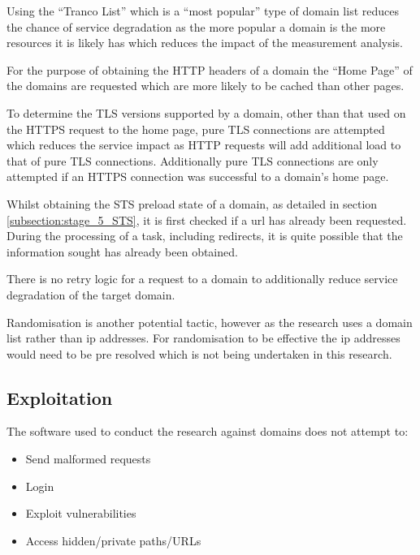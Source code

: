 \documentclass{mscreport}
\begin{document}
Using the ``Tranco List'' which is a ``most popular'' type of domain list reduces the chance of service degradation as the more popular a domain is the more resources it is likely has which reduces the impact of the measurement analysis.

\vspace{0.3cm} \noindent
For the purpose of obtaining the HTTP headers of a domain the ``Home Page'' of the domains are requested which are more likely to be cached than other pages.

\vspace{0.3cm} \noindent
To determine the TLS versions supported by a domain, other than that used on the HTTPS request to the home page, pure TLS connections are attempted which reduces the service impact as HTTP requests will add additional load to that of pure TLS connections. Additionally pure TLS connections are only attempted if an HTTPS connection was successful to a domain's home page.

\vspace{0.3cm} \noindent
Whilst obtaining the STS preload state of a domain, as detailed in section \ref{subsection:stage_5_STS}, it is first checked if a url has already been requested. During the processing of a task, including redirects, it is quite possible that the information sought has already been obtained.

\vspace{0.3cm} \noindent
There is no retry logic for a request to a domain to additionally reduce service degradation of the target domain.

\vspace{0.3cm} \noindent
Randomisation is another potential tactic, however as the research uses a domain list rather than ip addresses. For randomisation to be effective the ip addresses would need to be pre resolved which is not being undertaken in this research.

\subsection{Exploitation}

The software used to conduct the research against domains does not attempt to:

\begin{itemize}
	\setlength\itemsep{0.1em}
    \item Send malformed requests
    \item Login
    \item Exploit vulnerabilities
    \item Access hidden/private paths/URLs
\end{itemize}
\end{document}

